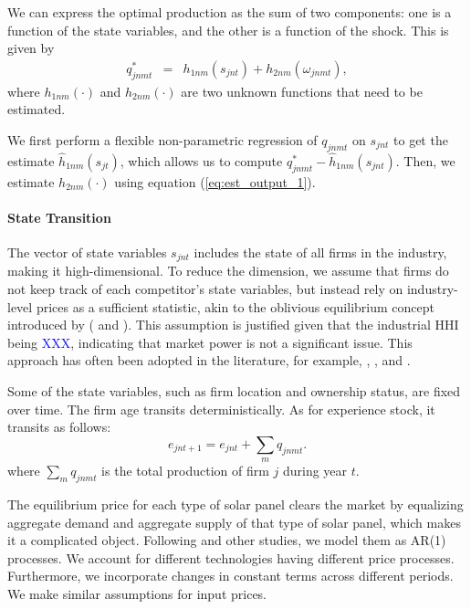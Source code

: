 \documentclass[12pt, letter]{article}
\begin{document}
We can express the optimal production as the sum of two components: one is a function of the state variables, and the other is a function of the shock. This is given by 
\begin{eqnarray}
q_{jnmt}^* &=& h_{1nm}(s_{jnt})+h_{2nm}(\omega_{jnmt}),\label{eq:est_output_2}
\end{eqnarray}
where $h_{1nm}(\cdot)$ and $h_{2nm}(\cdot)$ are two unknown functions that need to be estimated.

We first perform a flexible non-parametric regression of $q_{jnmt}$ on $s_{jnt}$ to get the estimate $\hat{h}_{1nm}(s_{jt})$, which allows us to compute $q^*_{jnmt}-\hat{h}_{1nm}(s_{jnt})$. Then, we estimate $h_{2nm}(\cdot)$ using equation (\ref{eq:est_output_1}).

\paragraph{State Transition}
The vector of state variables $s_{jnt}$ includes the state of all firms in the industry, making it high-dimensional. To reduce the dimension, we assume that firms do not keep track of each competitor's state variables, but instead rely on industry-level prices as a sufficient statistic, akin to the oblivious equilibrium concept introduced by (\citet{weintraub2008markov} and \citet{benkard2015oblivious}). This assumption is justified given that the industrial HHI being \textcolor{blue}{XXX}, indicating that market power is not a significant issue. This approach has often been adopted in the literature, for example, \citet{jeon2022learning}, \citet{chen2023structural}, and \citet{barwick2025industrial}.

Some of the state variables, such as firm location and ownership status, are fixed over time. The firm age transits deterministically. As for experience stock, it transits as follows:
\[
e_{jnt+1}  =  e_{jnt} + \sum_m q_{jnmt}.
\]
where $\sum_m q_{jnmt}$ is the total production of firm $j$ during year $t$.

The equilibrium price for each type of solar panel clears the market by equalizing aggregate demand and aggregate supply of that type of solar panel, which makes it a complicated object. Following \citet{barwick2025industrial} and other studies, we model them as AR(1) processes. We account for different technologies having different price processes. Furthermore, we incorporate changes in constant terms across different periods. We make similar assumptions for input prices. 
\end{document}
